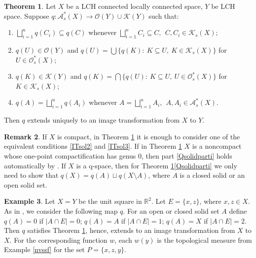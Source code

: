 \documentclass[sn-mathphys-num]{sn-jnl}%
\theoremstyle{thmstyleone}%
\theoremstyle{definition}
\newtheorem{theorem}{Theorem}%
\newtheorem{example}[theorem]{Example}
\newtheorem{remark}[theorem]{Remark}
\begin{document}
\begin{theorem}  \label{ITsolid}
Let $X$ be a LCH connected locally connected space, $Y$ be LCH space. 
Suppose $q: \mathscr{A}_{s}^{*}(X) \longrightarrow  \mathscr{O}(Y) \cup \mathscr{K}(Y)$ such that:
\begin{enumerate}[label=(\roman*),ref=(\roman*)]
\item \label{ITsol1}
$ \bigsqcup_{i=1}^n q(C_i) \subseteq q(C)$ whenever $\bigsqcup_{i=1}^n C_i \subseteq C,  \ \  C, C_i \in \mathscr{K}_{s}(X)$; 
\item  \label{ITsol2}
$q(U) \in \mathscr{O}(Y)$ and  $q(U) = \bigcup \{ q(K): \ K \subseteq U , \ K \in \mathscr{K}_{s}(X) \}$ for $U \in \mathscr{O}_{s}^{*}(X)$; 
\item \label{ITsol3}
$q(K) \in \mathscr{K}(Y)$ and  $q(K) = \bigcap \{ q(U) : \  K \subseteq U, \ U \in \mathscr{O}_{s}^{*}(X) \}$ for $ K  \in \mathscr{K}_{s}(X)$; 
\item  \label{Qsolidparti}
$ q(A) = \bigsqcup_{i=1}^n q (A_i)$ whenever $A = \bigsqcup_{i=1}^n A_i, \ \ A , A_i  \in \mathscr{A}_{s}^{*}(X)$.
\end{enumerate}
Then $q$ extends uniquely to an image transformation from $X$ to $Y$. 
\end{theorem}

\begin{remark} \label{easysolpar}
If $X$ is compact,  in Theorem \ref{ITsolid}  it is enough to consider one of the equivalent conditions \ref{ITsol2} and \ref{ITsol3}.  
If in Theorem \ref{ITsolid} $X$ is a noncompact whose one-point compactification has genus $0$,
then part \ref{Qsolidparti} holds automatically by \cite[L. 15.2]{Butler:TMLCconstr}.  
If $X$ is a q-space, then for Theorem \ref{ITsolid}\ref{Qsolidparti} we only need to show that 
$q(X) = q(A) \sqcup q(X \setminus A)$, where $A$ is a closed solid or an open solid set.
\end{remark}

\begin{example} \label{3pts2vIT}
Let $X = Y$ be the unit square in $\mathbb{R}^2$. Let $E = \{x, z\}$, where $x, z\in X$. As in \cite[p. 46]{AarnesGrubb}, we consider the following map $q$.
For an open or closed solid set $A$ define $q(A) = 0$ if $| A \cap E| = 0$; $q(A) =A $ if $| A \cap E| = 1$; $q(A) = X$ if $| A \cap E| = 2$. 
Then $q$ satisfies Theorem \ref{ITsolid}, hence, extends to an image transformation from $X$ to $X$.
For the corresponding function $w$, each $w(y)$ is the topological measure from Example \ref{nvssf} for 
the set $P = \{ x,z,y\}$.
\end{example}
\end{document}
